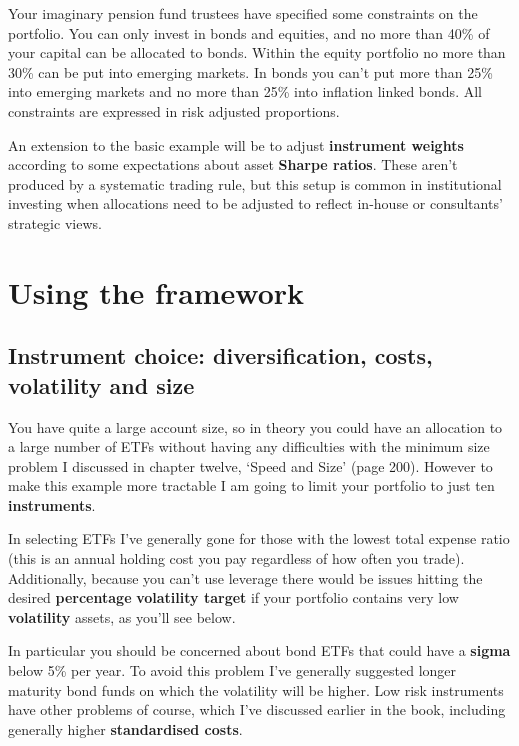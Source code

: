 Your imaginary pension fund trustees have specified some constraints on the portfolio. You can only invest in bonds and equities, and no more than 40\% of your capital can be allocated to bonds. Within the equity portfolio no more than 30\% can be put into emerging markets. In bonds you can't put more than 25\% into emerging markets and no more than 25\% into inflation linked bonds. All constraints are expressed in risk adjusted proportions.

An extension to the basic example will be to adjust \textbf{instrument weights} according to some expectations about asset \textbf{Sharpe ratios}. These aren't produced by a systematic trading rule, but this setup is common in institutional investing when allocations need to be adjusted to reflect in-house or consultants' strategic views.

\section*{Using the framework}  {}

\subsection*{Instrument choice: diversification, costs, volatility and size}

You have quite a large account size, so in theory you could have an allocation to a large number of ETFs without having any difficulties with the minimum size problem I discussed in chapter twelve, ‘Speed and Size' (page 200). However to make this example more tractable I am going to limit your portfolio to just ten \textbf{instruments}.

In selecting ETFs I've generally gone for those with the lowest total expense ratio (this is an annual holding cost you pay regardless of how often you trade). Additionally, because you can't use leverage there would be issues hitting the desired \textbf{percentage} \textbf{volatility target} if your portfolio contains very low \textbf{volatility} assets, as you'll see below.

In particular you should be concerned about bond ETFs that could have a \textbf{sigma} below 5\% per year. To avoid this problem I've generally suggested longer maturity bond funds on which the volatility will be higher. Low risk instruments have other problems of course, which I've discussed earlier in the book, including generally higher \textbf{standardised costs}.

